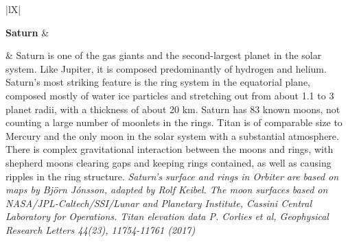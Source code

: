 \documentclass[Orbiter User Manual.tex]{subfiles}
\begin{document}
\begin{table}[H]
	\begin{tabularx}{\textwidth}{ |lX| }
	\hline\rule{0pt}{2ex}
	\textbf{Saturn} &\\
	\hline\rule{0pt}{2ex}
	& \vfill
	Saturn is one of the gas giants and the second-largest planet in the solar system. Like Jupiter, it is composed predominantly of hydrogen and helium. Saturn's most striking feature is the ring system in the equatorial plane, composed mostly of water ice particles and stretching out from about 1.1 to 3 planet radii, with a thickness of about 20 km.\newline
	Saturn has 83 known moons, not counting a large number of moonlets in the rings. Titan is of comparable size to Mercury and the only moon in the solar system with a substantial atmosphere. There is complex gravitational interaction between the moons and rings, with shepherd moons clearing gaps and keeping rings contained, as well as causing ripples in the ring structure.\newline
	\newline
	\textit{Saturn's surface and rings in Orbiter are based on maps by Björn Jónsson, adapted by Rolf Keibel. The moon surfaces based on NASA/JPL-Caltech/SSI/Lunar and Planetary Institute, Cassini Central Laboratory for Operations. Titan elevation data P. Corlies et al, Geophysical Research Letters 44(23), 11754-11761 (2017)}\\
	\hline
	\end{tabularx}
\end{table}
\end{document}
